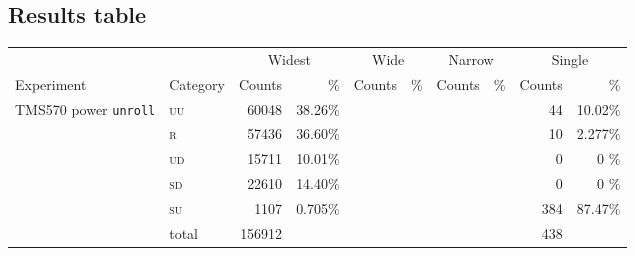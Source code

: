 \documentclass[10pt]{article}
\newcommand{\TI}{TMS570\xspace}
\newcommand{\unroll}{\texttt{unroll}\xspace}
\newcommand{\UU}{\textsc{uu}\xspace}
\newcommand{\UD}{\textsc{ud}\xspace}
\newcommand{\SU}{\textsc{su}\xspace}
\newcommand{\SD}{\textsc{sd}\xspace}
\newcommand{\R}{\textsc{r}\xspace}
\begin{document}
\newpage
\begin{appendices}


  \section{Results table}
  \label{apdx:results}

  \begin{table}[H]
    \centering
    \begin{tabular}{ll rr rr rr rr}
    \toprule

      &  & \multicolumn{2}{c}{Widest }     &    
           \multicolumn{2}{c}{Wide }      &    
           \multicolumn{2}{c}{Narrow }   &
           \multicolumn{2}{c}{Single }  \\
           \cmidrule(lr){3-4}                    
           \cmidrule(lr){5-6}
           \cmidrule(lr){7-8}
           \cmidrule(l){9-10}
      Experiment & \multicolumn{1}{c}{Category}  & 
      \multicolumn{1}{c}{Counts}      & \multicolumn{1}{r}{\%}          & 
      \multicolumn{1}{c}{Counts}      & \multicolumn{1}{r}{\%}          & 
      \multicolumn{1}{c}{Counts}      & \multicolumn{1}{r}{\%}          & 
      \multicolumn{1}{c}{Counts}      & \%         \\

    \midrule

    \multicolumn{1}{c}{\multirow{3}{*}{ \parbox{2cm}{\TI power \unroll}}}

    & \UU    
    & 60048  & 38.26\%                   
    & &  
    & &     
    &  44  &  10.02\%   
    \\
    & \R   
    & 57436  & 36.60\%                   
    & &  
    & &     
    &  10  &  2.277\%   
    \\
    & \UD  
    & 15711  & 10.01\%                   
    & &  
    & &     
    &  0   &  0    \%   
    \\
    & \SD     
    & 22610  & 14.40\%                   
    & &  
    & &     
    &  0   &  0    \%   
    \\
    & \SU      
    & 1107   & 0.705\%                   
    & &  
    & &     
    &  384 &  87.47\%   
    \\

    \cmidrule(l){2-10}
    & total    
    & 156912 &                            
    & &  
    & & 
    &  438 &             
    \\       


\end{tabular}
\end{table}
\end{appendices}
\end{document}
